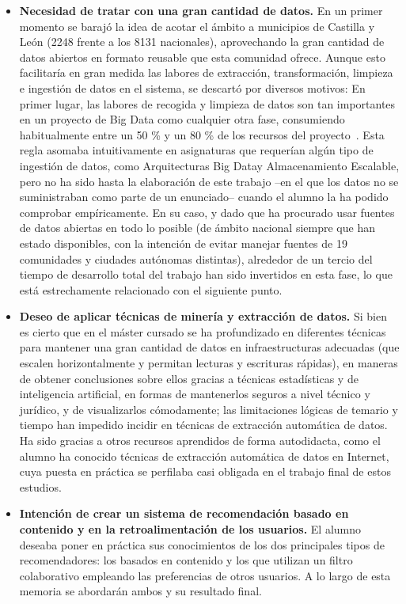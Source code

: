 \begin{itemize}
    \item \textbf{Necesidad de tratar con una gran cantidad de datos.} En un primer momento se barajó la idea de acotar el ámbito a municipios de Castilla y León (2248 frente a los 8131 nacionales), aprovechando la gran cantidad de datos abiertos en formato reusable que esta comunidad ofrece. Aunque esto facilitaría en gran medida las labores de extracción, transformación, limpieza e ingestión de datos en el sistema, se descartó por diversos motivos: En primer lugar, las labores de recogida y limpieza de datos son tan importantes en un proyecto de Big Data como cualquier otra fase, consumiendo habitualmente entre un 50 \% y un 80 \% de los recursos del proyecto~\cite{data_prep}. Esta regla asomaba intuitivamente en asignaturas que requerían algún tipo de ingestión de datos, como \guillemotleft Arquitecturas Big Data\guillemotright\space y \guillemotleft Almacenamiento Escalable\guillemotright, pero no ha sido hasta la elaboración de este trabajo –en el que los datos no se suministraban como parte de un enunciado– cuando el alumno la ha podido comprobar empíricamente. En su caso, y dado que ha procurado usar fuentes de datos abiertas en todo lo posible (de ámbito nacional siempre que han estado disponibles, con la intención de evitar manejar fuentes de 19 comunidades y ciudades autónomas distintas), alrededor de un tercio del tiempo de desarrollo total del trabajo han sido invertidos en esta fase, lo que está estrechamente relacionado con el siguiente punto.
    \item \textbf{Deseo de aplicar técnicas de minería y extracción de datos.} Si bien es cierto que en el máster cursado se ha profundizado en diferentes técnicas para mantener una gran cantidad de datos en infraestructuras adecuadas (que escalen horizontalmente y permitan lecturas y escrituras rápidas), en maneras de obtener conclusiones sobre ellos gracias a técnicas estadísticas y de inteligencia artificial, en formas de mantenerlos seguros a nivel técnico y jurídico, y de visualizarlos cómodamente; las limitaciones lógicas de temario y tiempo han impedido incidir en técnicas de extracción automática de datos. Ha sido gracias a otros recursos aprendidos de forma autodidacta, como el alumno ha conocido técnicas de extracción automática de datos en Internet, cuya puesta en práctica se perfilaba casi obligada en el trabajo final de estos estudios.
    \item \textbf{Intención de crear un sistema de recomendación basado en contenido y en la retroalimentación de los usuarios.} El alumno deseaba poner en práctica sus conocimientos de los dos principales tipos de recomendadores: los basados en contenido y los que utilizan un filtro colaborativo empleando las preferencias de otros usuarios. A lo largo de esta memoria se abordarán ambos y su resultado final.

\end{itemize}
